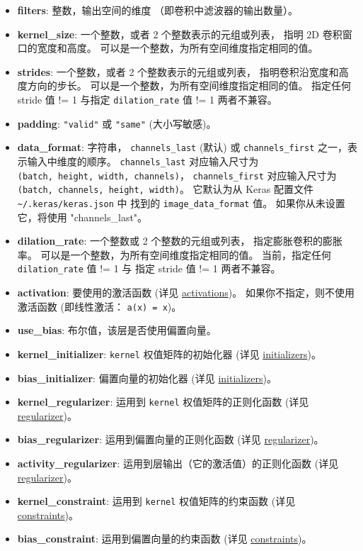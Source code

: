 \begin{itemize}
\tightlist
\item
  \textbf{filters}: 整数，输出空间的维度 （即卷积中滤波器的输出数量）。
\item
  \textbf{kernel\_size}: 一个整数，或者 2 个整数表示的元组或列表， 指明
  2D 卷积窗口的宽度和高度。 可以是一个整数，为所有空间维度指定相同的值。
\item
  \textbf{strides}: 一个整数，或者 2 个整数表示的元组或列表，
  指明卷积沿宽度和高度方向的步长。
  可以是一个整数，为所有空间维度指定相同的值。 指定任何 stride 值 != 1
  与指定 \texttt{dilation\_rate} 值 != 1 两者不兼容。
\item
  \textbf{padding}: \texttt{"valid"} 或 \texttt{"same"} (大小写敏感)。
\item
  \textbf{data\_format}: 字符串， \texttt{channels\_last} (默认) 或
  \texttt{channels\_first} 之一，表示输入中维度的顺序。
  \texttt{channels\_last} 对应输入尺寸为
  \texttt{(batch,\ height,\ width,\ channels)}，
  \texttt{channels\_first} 对应输入尺寸为
  \texttt{(batch,\ channels,\ height,\ width)}。 它默认为从 Keras
  配置文件 \texttt{\textasciitilde{}/.keras/keras.json} 中 找到的
  \texttt{image\_data\_format} 值。 如果你从未设置它，将使用
  "channels\_last"。
\item
  \textbf{dilation\_rate}: 一个整数或 2 个整数的元组或列表，
  指定膨胀卷积的膨胀率。 可以是一个整数，为所有空间维度指定相同的值。
  当前，指定任何 \texttt{dilation\_rate} 值 != 1 与 指定 stride 值 != 1
  两者不兼容。
\item
  \textbf{activation}: 要使用的激活函数 (详见
  \hyperref[activations]{activations})。
  如果你不指定，则不使用激活函数 (即线性激活： \texttt{a(x)\ =\ x})。
\item
  \textbf{use\_bias}: 布尔值，该层是否使用偏置向量。
\item
  \textbf{kernel\_initializer}: \texttt{kernel} 权值矩阵的初始化器 (详见
   \hyperref[initializers]{initializers})。
\item
  \textbf{bias\_initializer}: 偏置向量的初始化器 (详见
   \hyperref[initializers]{initializers})。
\item
  \textbf{kernel\_regularizer}: 运用到 \texttt{kernel}
  权值矩阵的正则化函数 (详见  \hyperref[regularizers]{regularizer})。
\item
  \textbf{bias\_regularizer}: 运用到偏置向量的正则化函数 (详见
  \hyperref[regularizers]{regularizer})。
\item
  \textbf{activity\_regularizer}: 运用到层输出（它的激活值）的正则化函数
  (详见 \hyperref[regularizers]{regularizer})。
\item
  \textbf{kernel\_constraint}: 运用到 \texttt{kernel} 权值矩阵的约束函数
  (详见 \hyperref[constraints]{constraints})。
\item
  \textbf{bias\_constraint}: 运用到偏置向量的约束函数 (详见
  \hyperref[constraints]{constraints})。
\end{itemize}

